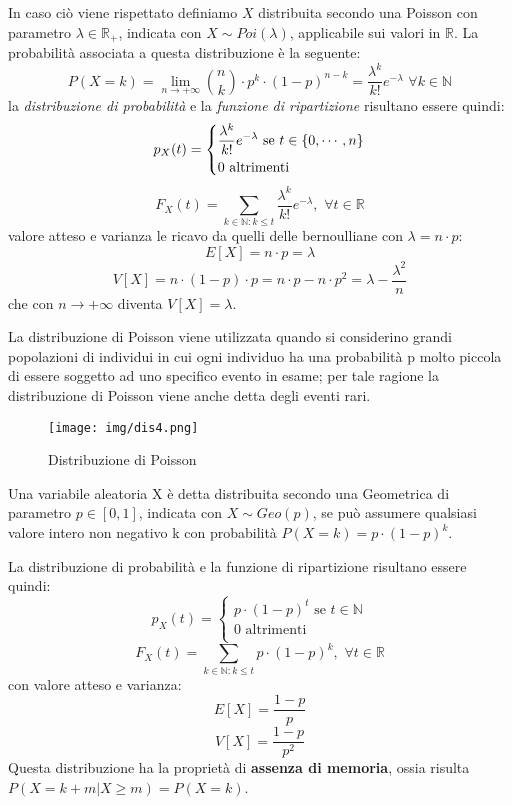 \documentclass[a4paper,12pt, oneside]{book}
\newcommand{\numberset}{\mathbb}
\newcommand{\N}{\numberset{N}}
\newcommand{\R}{\numberset{R}}
\begin{document}
In caso ciò viene rispettato definiamo $X$ distribuita secondo una Poisson con parametro $\lambda \in \R_+$,
indicata con $X \sim Poi(\lambda)$, applicabile sui valori in $\R$.\newline
La probabilità associata a questa distribuzione è la seguente:
\[ P(X = k) = \lim_{n \to +\infty} \binom{n}{k} \cdot p^k \cdot (1-p)^{n-k} = \frac{\lambda^k}{k!} 
                                                                              e^{-\lambda} \,\, \forall k \in \N\]
la \textit{distribuzione di probabilità} e la \textit{funzione di ripartizione} risultano essere quindi:
\[p_X(t) = \begin{dcases}
           \frac{\lambda^k}{k!} e^{-\lambda} \mbox{ se } t \in \{0,\cdots, n\}\\
           0                                 \mbox{ altrimenti}\\
           \end{dcases}\]
        \[F_X(t) = \sum_{k \in \N:k \leq t} \frac{\lambda^k}{k!} e^{-\lambda},\,\,\forall t \in \R \]
valore atteso e varianza le ricavo da quelli delle bernoulliane con $\lambda = n\cdot p$:
\[E[X] = n \cdot p = \lambda\]
\[V[X] = n \cdot (1-p) \cdot p = n \cdot p-n \cdot p^2 = \lambda-\frac{\lambda^2}{n}\]
che con $n \to +\infty$ diventa $V[X] = \lambda$.

La distribuzione di Poisson viene utilizzata quando si considerino grandi popolazioni di individui in cui 
ogni individuo ha una probabilità p molto piccola di essere soggetto ad uno specifico evento in esame;
per tale ragione la distribuzione di Poisson viene anche detta degli eventi rari.
\begin{figure}
    \caption{Distribuzione di Poisson}
    \label{fig:poisson}
	\texttt{[image: img/dis4.png]}
\end{figure}

Una variabile aleatoria X è detta distribuita secondo una Geometrica di parametro $p\in[0,1]$, indicata con $X \sim Geo(p)$,
se può assumere qualsiasi valore intero non negativo k con probabilità $P(X = k) = p \cdot (1-p)^k$.

La distribuzione di probabilità e la funzione di ripartizione risultano essere quindi:
\[p_X(t) = \begin{cases}
            p \cdot (1-p)^t \mbox{ se } t \in \N\\
            0               \mbox{ altrimenti}\\
           \end{cases}\]
\[F_X(t) = \sum_{k \in \N:k \leq t} p \cdot (1-p)^k,\,\,\forall t \in \R\]
con valore atteso e varianza:
\[E[X] = \frac{1-p}{p}\]
\[V[X] = \frac{1-p}{p^2}\]
Questa distribuzione ha la proprietà di \textbf{assenza di memoria}, ossia risulta $P(X = k + m | X \geq m) = P(X = k)$. 
\end{document}
